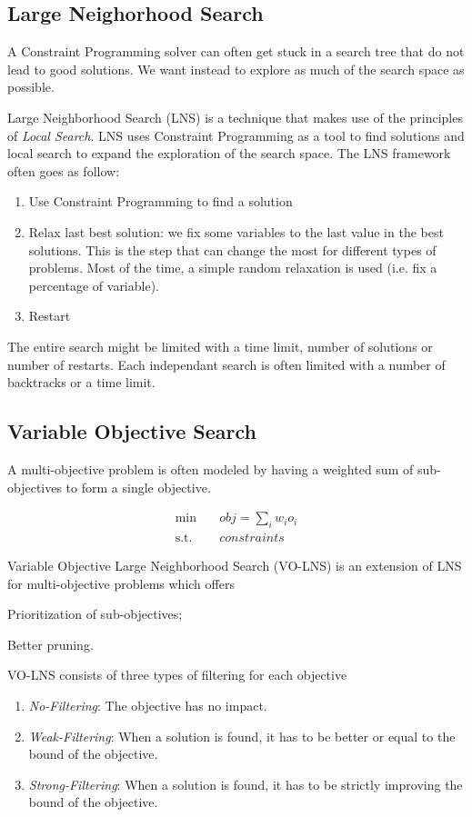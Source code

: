 \documentclass[../../thesis.tex]{subfiles}
\begin{document}
\subsection{Large Neighorhood Search}

A Constraint Programming solver can often get stuck in a search tree that do not lead to good solutions.
We want instead to explore as much of the search space as possible. 

Large Neighborhood Search (LNS) is a technique that makes use of the principles of \emph{Local Search}.
LNS uses Constraint Programming as a tool to find solutions and local search to expand the exploration of the search space. 
The LNS framework often goes as follow:

\begin{enumerate}
  \item Use Constraint Programming to find a solution 
  \item Relax last best solution: we fix some variables to the last value in the best solutions. This is the 
        step that can change the most for different types of problems. Most of the time, a simple random relaxation is used (i.e. fix a percentage of variable).
  \item Restart
\end{enumerate}

The entire search might be limited with a time limit, number of solutions or number of restarts. Each independant search 
is often limited with a number of backtracks or a time limit.

\subsection{Variable Objective Search}

A multi-objective problem is often modeled by having a weighted sum of sub-objectives to form a 
single objective.

\begin{align*}
  \text{min} \quad & obj = \sum_{i} w_i o_i \\
  \text{s.t.} \quad & constraints
\end{align*}

Variable Objective Large Neighborhood Search (VO-LNS) \cite{Schaus:VOLNS} is an extension of LNS for multi-objective 
problems which offers
\begin{enumerate*}[label=(\roman*)]
  \item Prioritization of sub-objectives;
  \item Better pruning.
\end{enumerate*}
VO-LNS consists of three types of filtering for each objective
\begin{enumerate}
  \item \emph{No-Filtering}: The objective has no impact.
  \item \emph{Weak-Filtering}: When a solution is found, it has to be better or equal to the bound of the objective. 
  \item \emph{Strong-Filtering}: When a solution is found, it has to be strictly improving the bound of the objective.
\end{enumerate}
\end{document}
